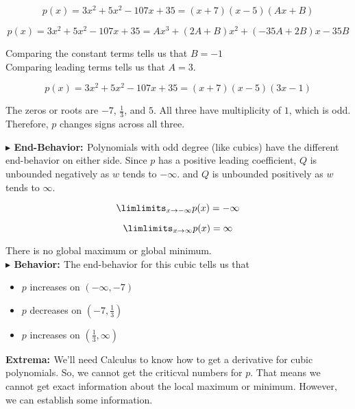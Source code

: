 \documentclass{ximera}
\begin{document}
\begin{exercise}
\[
p(x) = 3 x^2 + 5 x^2 - 107 x + 35 = (x+7)(x-5)(A x + B)
\]




\[
p(x) = 3 x^2 + 5 x^2 - 107 x + 35 = A x^3 + (2 A + B) x^2 + (-35 A + 2 B) x - 35 B 
\]


Comparing the constant terms tells us that $B = -1$ \\



Comparing leading terms tells us that $A = 3$.




\[
p(x) = 3 x^2 + 5 x^2 - 107 x + 35 = (x+7)(x-5)(3 x - 1)
\]





The zeros or roots are $-7$, $\frac{1}{3}$, and $5$.  All three have multiplicity of $1$, which is odd.  Therefore, $p$ changes signs across all three.










\textbf{\textcolor{blue!55!black}{$\blacktriangleright$ End-Behavior: }} Polynomials with odd degree (like cubics) have the different end-behavior on either side.  Since $p$ has a positive leading coefficient, $Q$ is unbounded negatively as $w$ tends to $-\infty$. and $Q$ is unbounded positively as $w$ tends to $\infty$.

\[
\limlimits_{x \to -\infty} p(x) = -\infty
\]


\[
\limlimits_{x \to \infty} p(x) = \infty
\]


There is no global maximum or global minimum. \\



\textbf{\textcolor{blue!55!black}{$\blacktriangleright$ Behavior: }}  The end-behavior for this cubic tells us that 



\begin{itemize}
\item $p$ increases on $(-\infty, -7)$ 
\item $p$ decreases on $\left( -7, \frac{1}{3} \right)$
\item $p$ increases on $\left( \frac{1}{3}, \infty \right)$
\end{itemize}




\textbf{\textcolor{$\blacktriangleright$ blue!55!black}{Extrema: }}  We'll need Calculus to know how to get a derivative for cubic polynomials.  So, we cannot get the criticval numbers for $p$.  That means we cannot get exact information about the local maximum or minimum.  However, we can establish some information.






\end{exercise}
\end{document}
